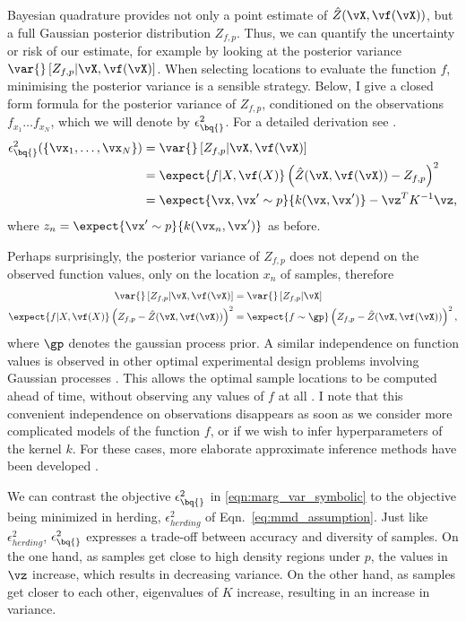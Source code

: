 Bayesian quadrature provides not only a point estimate of $\hat{Z}(\vX,\vf(\vX))$, but a full Gaussian posterior distribution $Z_{f,p}$. Thus, we can quantify the uncertainty or risk of our estimate, for example by looking at the posterior variance $\var{} \left[ Z_{f,p} \vert \vX, \vf(\vX) \right]$. When selecting locations to evaluate the function $f$, minimising the posterior variance is a sensible strategy. Below, I give a closed form formula for the posterior variance of $Z_{f,p}$, conditioned on the observations $f_{x_1} \dots f_{x_N}$, which we will denote by $\epsilon^2_{\bq{}}$. For a detailed derivation see \citep{BZMonteCarlo}.
\begin{align}
	\epsilon^{2}_{\bq{}}(\{ \vx_1,\ldots,\vx_N \}) &= \var{} \left[ Z_{f,p} \vert \vX, \vf(\vX) \right]\\
	&= \expect{f\vert X,\vf(X)} \left( \hat{Z}(\vX,\vf(\vX)) - Z_{f,p} \right)^2\\
	&= \expect{\vx, \vx' \sim p}{k(\vx, \vx')} - \vz^T K^{-1} \vz\mbox{,}
		\label{eqn:marg_var_symbolic}
\end{align}
%
where $z_n = \expect{\vx' \sim p}{k(\vx_n, \vx')}$ as before.

Perhaps surprisingly, the posterior variance of $Z_{f,p}$ does not depend on the observed function values, only on the location $x_n$ of samples, therefore
%
\begin{align}
	\var{} \left[ Z_{f,p} \vert \vX, \vf(\vX) \right] &= \var{} \left[ Z_{f,p} \vert \vX \right]\\
\expect{f\vert X,\vf(X)} \left( Z_{f,p} - \hat{Z}(\vX,\vf(\vX))  \right)^2 &= \expect{f\sim\gp} \left( Z_{f,p} - \hat{Z}(\vX,\vf(\vX)) \right)^2,\label{eqn:variance_independent}
\end{align}
%
where $\gp$ denotes the gaussian process prior. A similar independence on function values is observed in other optimal experimental design problems involving Gaussian processes \citep{Krause2006}. This allows the optimal sample locations to be computed ahead of time, without observing any values of $f$ at all \citep{minka2000dqr}. I note that this convenient independence on observations disappears as soon as we consider more complicated models of the function $f$, or if we wish to infer hyperparameters of the kernel $k$. For these cases, more elaborate approximate inference methods have been developed \citep[see \eg][]{Osborne2012}.

We can contrast the \bq{} objective $\epsilon^{2}_{\bq{}}$ in \eqref{eqn:marg_var_symbolic} to the objective being minimized in herding, $\epsilon^{2}_{herding}$ of Eqn.\ \eqref{eq:mmd_assumption}. Just like $\epsilon^{2}_{herding}$, $\epsilon^{2}_{\bq{}}$ expresses a trade-off between accuracy and diversity of samples. On the one hand, as samples get close to high density regions under $p$, the values in $\vz$ increase, which results in decreasing variance. On the other hand, as samples get closer to each other, eigenvalues of $K$ increase, resulting in an increase in variance. 

